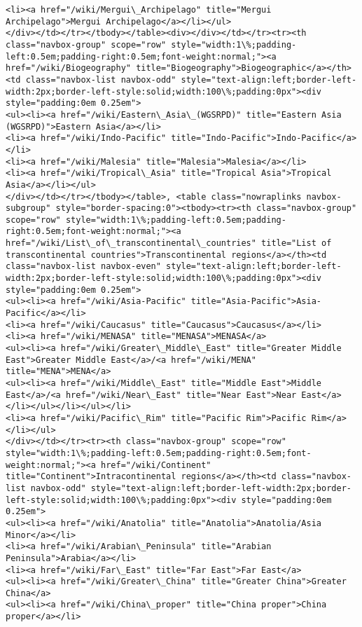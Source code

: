 \documentclass[11pt]{article}
\begin{document}
\begin{Verbatim}[commandchars=\\\{\}]
<li><a href="/wiki/Mergui\_Archipelago" title="Mergui Archipelago">Mergui Archipelago</a></li></ul>
</div></td></tr></tbody></table><div></div></td></tr><tr><th class="navbox-group" scope="row" style="width:1\%;padding-left:0.5em;padding-right:0.5em;font-weight:normal;"><a href="/wiki/Biogeography" title="Biogeography">Biogeographic</a></th><td class="navbox-list navbox-odd" style="text-align:left;border-left-width:2px;border-left-style:solid;width:100\%;padding:0px"><div style="padding:0em 0.25em">
<ul><li><a href="/wiki/Eastern\_Asia\_(WGSRPD)" title="Eastern Asia (WGSRPD)">Eastern Asia</a></li>
<li><a href="/wiki/Indo-Pacific" title="Indo-Pacific">Indo-Pacific</a></li>
<li><a href="/wiki/Malesia" title="Malesia">Malesia</a></li>
<li><a href="/wiki/Tropical\_Asia" title="Tropical Asia">Tropical Asia</a></li></ul>
</div></td></tr></tbody></table>, <table class="nowraplinks navbox-subgroup" style="border-spacing:0"><tbody><tr><th class="navbox-group" scope="row" style="width:1\%;padding-left:0.5em;padding-right:0.5em;font-weight:normal;"><a href="/wiki/List\_of\_transcontinental\_countries" title="List of transcontinental countries">Transcontinental regions</a></th><td class="navbox-list navbox-even" style="text-align:left;border-left-width:2px;border-left-style:solid;width:100\%;padding:0px"><div style="padding:0em 0.25em">
<ul><li><a href="/wiki/Asia-Pacific" title="Asia-Pacific">Asia-Pacific</a></li>
<li><a href="/wiki/Caucasus" title="Caucasus">Caucasus</a></li>
<li><a href="/wiki/MENASA" title="MENASA">MENASA</a>
<ul><li><a href="/wiki/Greater\_Middle\_East" title="Greater Middle East">Greater Middle East</a>/<a href="/wiki/MENA" title="MENA">MENA</a>
<ul><li><a href="/wiki/Middle\_East" title="Middle East">Middle East</a>/<a href="/wiki/Near\_East" title="Near East">Near East</a></li></ul></li></ul></li>
<li><a href="/wiki/Pacific\_Rim" title="Pacific Rim">Pacific Rim</a></li></ul>
</div></td></tr><tr><th class="navbox-group" scope="row" style="width:1\%;padding-left:0.5em;padding-right:0.5em;font-weight:normal;"><a href="/wiki/Continent" title="Continent">Intracontinental regions</a></th><td class="navbox-list navbox-odd" style="text-align:left;border-left-width:2px;border-left-style:solid;width:100\%;padding:0px"><div style="padding:0em 0.25em">
<ul><li><a href="/wiki/Anatolia" title="Anatolia">Anatolia/Asia Minor</a></li>
<li><a href="/wiki/Arabian\_Peninsula" title="Arabian Peninsula">Arabia</a></li>
<li><a href="/wiki/Far\_East" title="Far East">Far East</a>
<ul><li><a href="/wiki/Greater\_China" title="Greater China">Greater China</a>
<ul><li><a href="/wiki/China\_proper" title="China proper">China proper</a></li>

\end{Verbatim}
\end{document}
